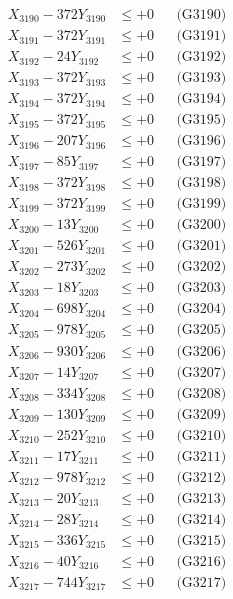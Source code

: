 \documentclass[a4paper,10pt]{article}
\begin{document}
{\begin{align}
X_{3190} - 372Y_{3190} &\leq +0 && \text{(G3190)} \\
\allowbreak
X_{3191} - 372Y_{3191} &\leq +0 && \text{(G3191)} \\
X_{3192} - 24Y_{3192} &\leq +0 && \text{(G3192)} \\
X_{3193} - 372Y_{3193} &\leq +0 && \text{(G3193)} \\
X_{3194} - 372Y_{3194} &\leq +0 && \text{(G3194)} \\
X_{3195} - 372Y_{3195} &\leq +0 && \text{(G3195)} \\
X_{3196} - 207Y_{3196} &\leq +0 && \text{(G3196)} \\
X_{3197} - 85Y_{3197} &\leq +0 && \text{(G3197)} \\
X_{3198} - 372Y_{3198} &\leq +0 && \text{(G3198)} \\
X_{3199} - 372Y_{3199} &\leq +0 && \text{(G3199)} \\
X_{3200} - 13Y_{3200} &\leq +0 && \text{(G3200)} \\
\allowbreak
X_{3201} - 526Y_{3201} &\leq +0 && \text{(G3201)} \\
X_{3202} - 273Y_{3202} &\leq +0 && \text{(G3202)} \\
X_{3203} - 18Y_{3203} &\leq +0 && \text{(G3203)} \\
X_{3204} - 698Y_{3204} &\leq +0 && \text{(G3204)} \\
X_{3205} - 978Y_{3205} &\leq +0 && \text{(G3205)} \\
X_{3206} - 930Y_{3206} &\leq +0 && \text{(G3206)} \\
X_{3207} - 14Y_{3207} &\leq +0 && \text{(G3207)} \\
X_{3208} - 334Y_{3208} &\leq +0 && \text{(G3208)} \\
X_{3209} - 130Y_{3209} &\leq +0 && \text{(G3209)} \\
X_{3210} - 252Y_{3210} &\leq +0 && \text{(G3210)} \\
\allowbreak
X_{3211} - 17Y_{3211} &\leq +0 && \text{(G3211)} \\
X_{3212} - 978Y_{3212} &\leq +0 && \text{(G3212)} \\
X_{3213} - 20Y_{3213} &\leq +0 && \text{(G3213)} \\
X_{3214} - 28Y_{3214} &\leq +0 && \text{(G3214)} \\
X_{3215} - 336Y_{3215} &\leq +0 && \text{(G3215)} \\
X_{3216} - 40Y_{3216} &\leq +0 && \text{(G3216)} \\
X_{3217} - 744Y_{3217} &\leq +0 && \text{(G3217)} \\

\end{align}}
\end{document}
